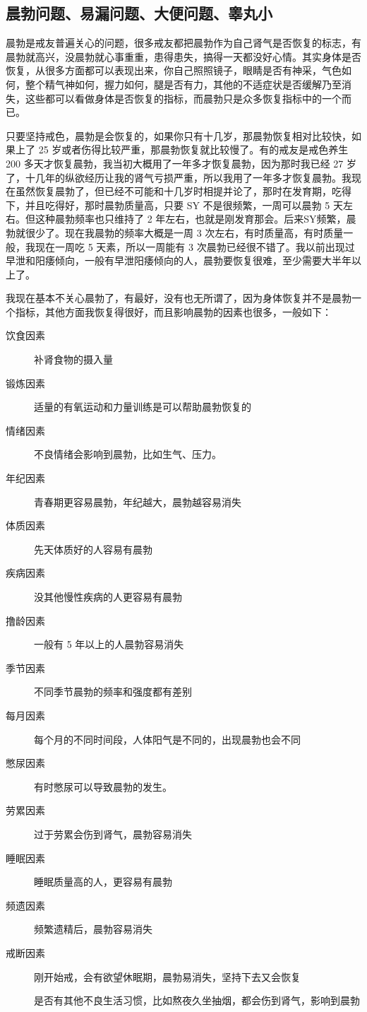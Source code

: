 \documentclass{ctexart}
\begin{document}
\subsection{晨勃问题、易漏问题、大便问题、睾丸小}

晨勃是戒友普遍关心的问题，很多戒友都把晨勃作为自己肾气是否恢复的标志，有晨勃就高兴，没晨勃就心事重重，患得患失，搞得一天都没好心情。其实身体是否恢复，从很多方面都可以表现出来，你自己照照镜子，眼睛是否有神采，气色如何，整个精气神如何，握力如何，腿是否有力，其他的不适症状是否缓解乃至消失，这些都可以看做身体是否恢复的指标，而晨勃只是众多恢复指标中的一个而已。

只要坚持戒色，晨勃是会恢复的，如果你只有十几岁，那晨勃恢复相对比较快，如果上了 25 岁或者伤得比较严重，那晨勃恢复就比较慢了。有的戒友是戒色养生 200 多天才恢复晨勃，我当初大概用了一年多才恢复晨勃，因为那时我已经 27 岁了，十几年的纵欲经历让我的肾气亏损严重，所以我用了一年多才恢复晨勃。我现在虽然恢复晨勃了，但已经不可能和十几岁时相提并论了，那时在发育期，吃得下，并且吃得好，那时晨勃质量高，只要 SY 不是很频繁，一周可以晨勃 5 天左右。但这种晨勃频率也只维持了 2 年左右，也就是刚发育那会。后来SY频繁，晨勃就很少了。现在我晨勃的频率大概是一周 3 次左右，有时质量高，有时质量一般，我现在一周吃 5 天素，所以一周能有 3 次晨勃已经很不错了。我以前出现过早泄和阳痿倾向，一般有早泄阳痿倾向的人，晨勃要恢复很难，至少需要大半年以上了。

我现在基本不关心晨勃了，有最好，没有也无所谓了，因为身体恢复并不是晨勃一个指标，其他方面我恢复得很好，而且影响晨勃的因素也很多，一般如下：

\begin{description}
    \item[饮食因素] 补肾食物的摄入量
    \item[锻炼因素] 适量的有氧运动和力量训练是可以帮助晨勃恢复的
    \item[情绪因素] 不良情绪会影响到晨勃，比如生气、压力。
    \item[年纪因素] 青春期更容易晨勃，年纪越大，晨勃越容易消失
    \item[体质因素] 先天体质好的人容易有晨勃
    \item[疾病因素] 没其他慢性疾病的人更容易有晨勃
    \item[撸龄因素] 一般有 5 年以上的人晨勃容易消失
    \item[季节因素] 不同季节晨勃的频率和强度都有差别
    \item[每月因素] 每个月的不同时间段，人体阳气是不同的，出现晨勃也会不同
    \item[憋尿因素] 有时憋尿可以导致晨勃的发生。
    \item[劳累因素] 过于劳累会伤到肾气，晨勃容易消失
    \item[睡眠因素] 睡眠质量高的人，更容易有晨勃
    \item[频遗因素] 频繁遗精后，晨勃容易消失
    \item[戒断因素] 刚开始戒，会有欲望休眠期，晨勃易消失，坚持下去又会恢复
    \item[] 是否有其他不良生活习惯，比如熬夜久坐抽烟，都会伤到肾气，影响到晨勃
\end{description}
\end{document}
